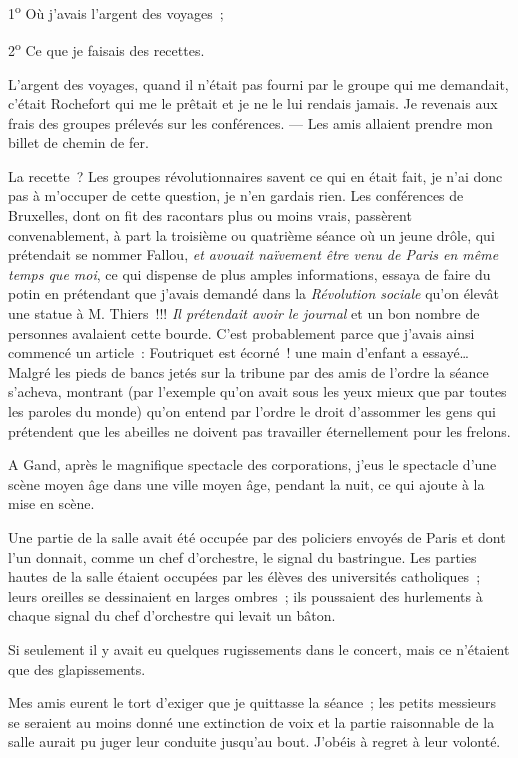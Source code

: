 \documentclass[french,twoside]{book} %
\begin{document}
1\textsuperscript{o} Où j’avais l’argent des voyages ;\par
2\textsuperscript{o} Ce que je faisais des recettes.\par
L’argent des voyages, quand il n’était pas fourni par le groupe qui me demandait, c’était Rochefort qui me le prêtait et je ne le lui rendais jamais. Je revenais aux frais des groupes prélevés sur les conférences. — Les amis allaient prendre mon billet de chemin de fer.\par
La recette ? Les groupes révolutionnaires savent ce qui en était fait, je n’ai donc pas à m’occuper de cette question, je n’en gardais rien. Les conférences de Bruxelles, dont on fit des racontars plus ou moins vrais, passèrent convenablement, à part la troisième ou quatrième séance où un jeune drôle, qui prétendait se nommer Fallou, \emph{et avouait naïvement être venu de Paris en même temps que moi}, ce qui dispense de plus amples informations, essaya de faire du potin en prétendant que j’avais demandé dans la \emph{Révolution sociale} qu’on élevât une statue à M. Thiers !!! \emph{Il prétendait avoir le journal} et un bon nombre  de personnes avalaient cette bourde. C’est probablement parce que j’avais ainsi commencé un article : Foutriquet est écorné ! une main d’enfant a essayé… Malgré les pieds de bancs jetés sur la tribune par des amis de l’ordre la séance s’acheva, montrant (par l’exemple qu’on avait sous les yeux mieux que par toutes les paroles du monde) qu’on entend par l’ordre le droit d’assommer les gens qui prétendent que les abeilles ne doivent pas travailler éternellement pour les frelons.\par
A Gand, après le magnifique spectacle des corporations, j’eus le spectacle d’une scène moyen âge dans une ville moyen âge, pendant la nuit, ce qui ajoute à la mise en scène.\par
Une partie de la salle avait été occupée par des policiers envoyés de Paris et dont l’un donnait, comme un chef d’orchestre, le signal du bastringue. Les parties hautes de la salle étaient occupées par les élèves des universités catholiques ; leurs oreilles se dessinaient en larges ombres ; ils poussaient des hurlements à chaque signal du chef d’orchestre qui levait un bâton.\par
Si seulement il y avait eu quelques rugissements dans le concert, mais ce n’étaient que des glapissements.\par
Mes amis eurent le tort d’exiger que je quittasse  la séance ; les petits messieurs se seraient au moins donné une extinction de voix et la partie raisonnable de la salle aurait pu juger leur conduite jusqu’au bout. J’obéis à regret à leur volonté.\par
\end{document}
